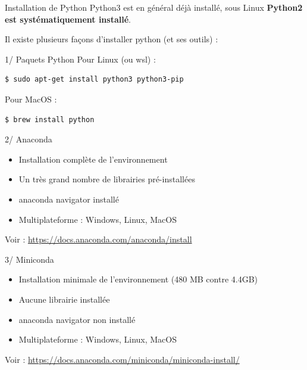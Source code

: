 \begin{frame}[fragile]{Installation de Python}
  Python3 est en général déjà installé, sous Linux 
  \textbf{Python2 est systématiquement installé}.
  
  Il existe plusieurs façons d'installer python (et ses outils) :

\begin{overprint}
    \begin{block}{1/ Paquets Python}
    \medskip
  Pour Linux (ou wsl) :
\begin{lstlisting}[language=bash, morekeywords=\$, numbers=none]
$ sudo apt-get install python3 python3-pip
\end{lstlisting}
  Pour MacOS :
\begin{lstlisting}[language=bash, morekeywords=\$, numbers=none]
$ brew install python
\end{lstlisting}
    \end{block}

    \begin{block}{2/ Anaconda}
    \medskip
      \begin{itemize}
        \item Installation complète de l'environnement
        \item Un très grand nombre de librairies pré-installées
        \item anaconda navigator installé
        \item Multiplateforme : Windows, Linux, MacOS
      \end{itemize}
    \end{block}
    Voir : \url{https://docs.anaconda.com/anaconda/install}

    \begin{block}{3/ Miniconda}
      \medskip
      \begin{itemize}
        \item Installation minimale de l'environnement (480 MB contre 4.4GB)
        \item Aucune librairie installée
        \item anaconda navigator non installé
        \item Multiplateforme : Windows, Linux, MacOS
      \end{itemize}
    \end{block}
    Voir : \small\url{https://docs.anaconda.com/miniconda/miniconda-install/}
\end{overprint}
\end{frame}

